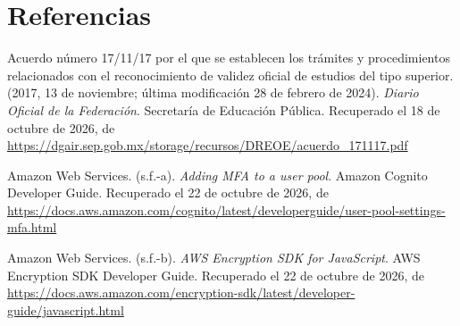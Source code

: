 \documentclass[12pt, a4paper]{article}
\makeatletter
\newcommand{\saltoseccion}{\par
  \ifx\@deferlist\@empty
    \ifdim\pagegoal<\maxdimen
      \ifdim\dimexpr\textheight-\pagegoal+\pagetotal\relax>0.5\textheight\clearpage\fi
    \fi
  \else\clearpage\fi}
\let\seccionbase\section
\renewcommand{\section}{\saltoseccion\seccionbase}
\makeatother
\begin{document}
%

\section*{Referencias}

\begin{list}{}{\setlength{\leftmargin}{1.27cm}\setlength{\itemindent}{-1.27cm}%
  \setlength{\labelwidth}{0pt}\setlength{\labelsep}{0pt}\setlength{\itemsep}{6pt}}\raggedright
 
\item Acuerdo número 17/11/17 por el que se establecen los trámites y
  procedimientos relacionados con el reconocimiento de validez oficial
  de estudios del tipo superior. (2017, 13 de noviembre; última
  modificación 28 de febrero de 2024). \textit{Diario Oficial de la
  Federación}. Secretaría de Educación Pública.
Recuperado el 18 de octubre de 2026, de \url{https://dgair.sep.gob.mx/storage/recursos/DREOE/acuerdo_171117.pdf}
 

\item Amazon Web Services. (s.f.-a). \textit{Adding MFA to a user pool}.
  Amazon Cognito Developer Guide. Recuperado el 22 de octubre de 2026, de \url{https://docs.aws.amazon.com/cognito/latest/developerguide/user-pool-settings-mfa.html}
 
 
\item Amazon Web Services. (s.f.-b). \textit{AWS Encryption SDK for
  JavaScript}. AWS Encryption SDK Developer Guide. Recuperado el 22 de octubre de 2026, de \url{https://docs.aws.amazon.com/encryption-sdk/latest/developer-guide/javascript.html}
 

\end{list}
\end{document}
